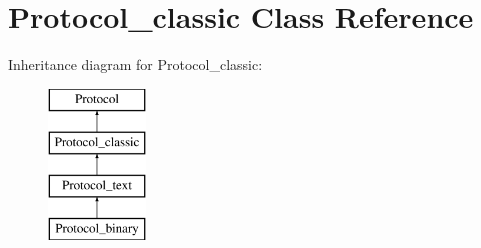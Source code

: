 \hypertarget{classProtocol__classic}{}\section{Protocol\+\_\+classic Class Reference}
\label{classProtocol__classic}
Inheritance diagram for Protocol\+\_\+classic\+:\begin{figure}[H]
\begin{center}
\leavevmode
\includegraphics[height=4.000000cm]{classProtocol__classic}
\end{center}
\end{figure}
